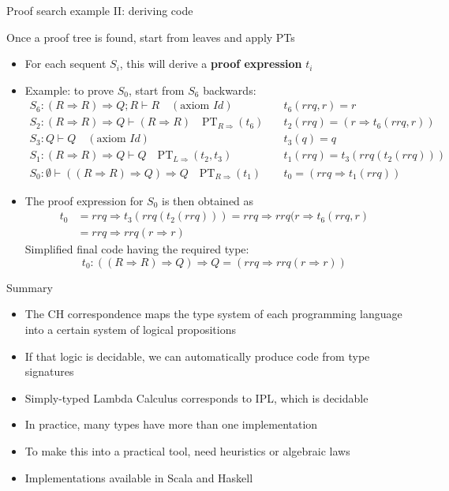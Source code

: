 \documentclass[english]{beamer}
\begin{document}
\begin{frame}{Proof search example II: deriving code}

Once a proof tree is found, start from leaves and apply PTs
\begin{itemize}
\item For each sequent $S_{i}$, this will derive a \textbf{proof expression}
$t_{i}$
\item Example: to prove $S_{0}$, start from $S_{6}$ backwards:{\footnotesize{}
\begin{align*}
S_{6}:\left(R\Rightarrow R\right)\Rightarrow Q;R\vdash R\quad(\text{axiom }Id)\quad & t_{6}(rrq,r)=r\\
S_{2}:\left(R\Rightarrow R\right)\Rightarrow Q\vdash\left(R\Rightarrow R\right)\quad\text{PT}_{R\Rightarrow}(t_{6})\quad & t_{2}(rrq)=\left(r\Rightarrow t_{6}(rrq,r)\right)\\
S_{3}:Q\vdash Q\quad(\text{axiom }Id)\quad & t_{3}(q)=q\\
S_{1}:\left(R\Rightarrow R\right)\Rightarrow Q\vdash Q\quad\text{PT}_{L\Rightarrow}(t_{2},t_{3})\quad & t_{1}(rrq)=t_{3}(rrq(t_{2}(rrq)))\\
S_{0}:\emptyset\vdash\left(\left(R\Rightarrow R\right)\Rightarrow Q\right)\Rightarrow Q\quad\text{PT}_{R\Rightarrow}(t_{1})\quad & t_{0}=\left(rrq\Rightarrow t_{1}(rrq)\right)
\end{align*}
}{\footnotesize \par}
\item The proof expression for $S_{0}$ is then obtained as
\begin{align*}
t_{0} & =rrq\Rightarrow t_{3}\left(rrq\left(t_{2}\left(rrq\right)\right)\right)=rrq\Rightarrow rrq(r\Rightarrow t_{6}\left(rrq,r\right)\\
 & =rrq\Rightarrow rrq\left(r\Rightarrow r\right)
\end{align*}
Simplified final code having the required type: 
\[
t_{0}:\left(\left(R\Rightarrow R\right)\Rightarrow Q\right)\Rightarrow Q=\left(rrq\Rightarrow rrq\left(r\Rightarrow r\right)\right)
\]
\end{itemize}
\end{frame}

\begin{frame}{Summary}

\begin{itemize}
\item The CH correspondence maps the type system of each programming language
into a certain system of logical propositions 
\item If that logic is decidable, we can automatically produce code from
type signatures
\item Simply-typed Lambda Calculus corresponds to IPL, which is decidable
\item In practice, many types have more than one implementation
\item To make this into a practical tool, need heuristics or algebraic laws
\item Implementations available in Scala and Haskell
\end{itemize}
\end{frame}
\end{document}
